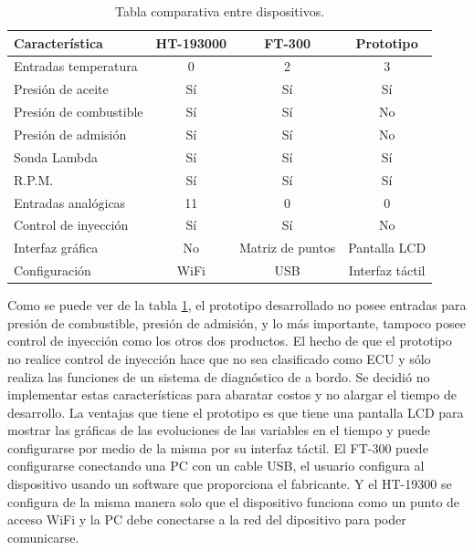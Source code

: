 \hfil


\begin{table}[h]
	\centering
	\caption[Tabla comparativa entre dispositivos.]{Tabla comparativa entre dispositivos.}
	\centering
	\begin{tabular}{l c c c}    
		\toprule
		\textbf{Característica }     & \textbf{HT-193000} & \textbf{FT-300} & \textbf{Prototipo}\\
		\midrule
		Entradas temperatura	&  0 &   2 &  3\\
		Presión de aceite		& Sí &  Sí & Sí\\
		Presión de combustible	& Sí &  Sí & No\\
		Presión de admisión		& Sí &  Sí & No\\
		Sonda Lambda			& Sí &  Sí & Sí\\
		R.P.M.					& Sí &  Sí & Sí\\
		Entradas analógicas		& 11 &  0  &  0\\
		Control de inyección	& Sí &  Sí & No\\
		Interfaz gráfica		& No &  Matriz de puntos & Pantalla LCD \\
		Configuración			& WiFi & USB & Interfaz táctil \\ 
		\bottomrule
	\end{tabular}
	\label{tab:comparativa}
\end{table}

Como se puede ver de la tabla \ref{tab:comparativa}, el prototipo desarrollado no posee entradas para presión de combustible, presión de admisión, y lo más importante, tampoco posee control de inyección como los otros dos productos. El hecho de que el prototipo no realice control de inyección hace que no sea clasificado como ECU y sólo realiza las funciones de un sistema de diagnóstico de a bordo. 
Se decidió no implementar estas características para abaratar costos y no alargar el tiempo de desarrollo. La ventajas que tiene el prototipo es que tiene una pantalla LCD para mostrar las gráficas de las evoluciones de las variables en el tiempo y puede configurarse por medio de la misma por su interfaz táctil. El FT-300 puede configurarse conectando una PC con un cable USB, el usuario configura al dispositivo usando un software que proporciona el fabricante. Y el HT-19300 se configura de la misma manera solo que el dispositivo funciona como un punto de acceso WiFi y la PC debe conectarse a la red del dipositivo para poder comunicarse.